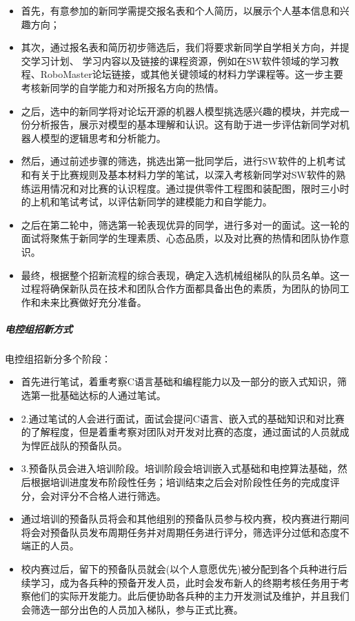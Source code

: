                 \begin{itemize}
                    \item 首先，有意参加的新同学需提交报名表和个人简历，以展示个人基本信息和兴趣方向；
                    \item 其次，通过报名表和简历初步筛选后，我们将要求新同学自学相关方向，并提交学习计划、 学习内容以及链接的课程资源，例如在SW软件领域的学习教程、RoboMaster论坛链接，或其他关键领域的材料力学课程等。这一步主要考核新同学的自学能力和对所报名方向的热情。
                    \item 之后，选中的新同学将对论坛开源的机器人模型挑选感兴趣的模块，并完成一份分析报告，展示对模型的基本理解和认识。这有助于进一步评估新同学对机器人模型的逻辑思考和分析能力。
                    \item 然后，通过前述步骤的筛选，挑选出第一批同学后，进行SW软件的上机考试和有关于比赛规则及基本材料力学的笔试，以深入考核新同学对SW软件的熟练运用情况和对比赛的认识程度。通过提供零件工程图和装配图，限时三小时的上机和笔试考试，以评估新同学的建模能力和自学能力。 
                    \item 之后在第二轮中，筛选第一轮表现优异的同学，进行多对一的面试。这一轮的面试将聚焦于新同学的生理素质、心态品质，以及对比赛的热情和团队协作意识。 
                    \item 最终，根据整个招新流程的综合表现，确定入选机械组梯队的队员名单。这一过程将确保新队员在技术和团队合作方面都具备出色的素质，为团队的协同工作和未来比赛做好充分准备。
                \end{itemize}

            \subparagraph{电控组招新方式}

                电控组招新分多个阶段：


                \begin{itemize}
                    \item 首先进行笔试，着重考察C语言基础和编程能力以及一部分的嵌入式知识，筛选第一批基础达标的人通过笔试。
                    \item 2.通过笔试的人会进行面试，面试会提问C语言、嵌入式的基础知识和对比赛的了解程度，但是着重考察对团队对开发对比赛的态度，通过面试的人员就成为悍匠战队的预备队员。
                    \item 3.预备队员会进入培训阶段。培训阶段会培训嵌入式基础和电控算法基础，然后根据培训进度发布阶段性任务；培训结束之后会对阶段性任务的完成度评分，会对评分不合格人进行筛选。
                    \item 通过培训的预备队员将会和其他组别的预备队员参与校内赛，校内赛进行期间将会对预备队员发布周期任务并对周期任务进行评分，筛选评分过低和态度不端正的人员。
                    \item 校内赛过后，留下的预备队员就会(以个人意愿优先)被分配到各个兵种进行后续学习，成为各兵种的预备开发人员，此时会发布新人的终期考核任务用于考察他们的实际开发能力。此后便协助各兵种的主力开发测试及维护，并且我们会筛选一部分出色的人员加入梯队，参与正式比赛。
                \end{itemize}

